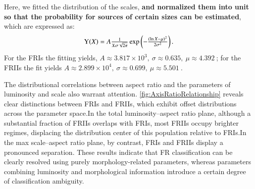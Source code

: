\documentclass{aa}
\begin{document}
Here, we fitted the distribution of the scales, \textbf{and normalized them into unit so that the probability for sources of certain sizes can be estimated}, which are expressed as:
\begin{equation} 
\makebox[\linewidth]{$\mathrm{Y}(X) = A\frac{1}{X \sigma \sqrt{2\pi}} \exp\left(-\frac{(\ln X- \mu )^2}{2\sigma^2}\right).$}
\end{equation}
For the FRIs the fitting yields,
$A \approx 3.817 \times 10^3,\  \sigma \approx 0.635,\ \mu \approx 4.392 \ $;
for the FRIIs the fit yields 
$ A \approx 2.899 \times 10^4,\  \sigma \approx 0.699,\ \mu \approx 5.501 \ $.

The distributional correlations between aspect ratio and the parameters of luminosity and scale also warrant attention.
\autoref{fig:AxisRatioRelationship} reveals clear distinctions between FRIs and FRIIs, which exhibit offset distributions across the parameter space.In the total luminosity–aspect ratio plane, although a substantial fraction of FRIIs overlaps with FRIs, most FRIIs occupy brighter regimes, displacing the distribution center of this population relative to FRIs.In the max scale–aspect ratio plane, by contrast, FRIs and FRIIs display a pronounced separation.
These results indicate that FR classification can be clearly resolved using purely morphology-related parameters, whereas parameters combining luminosity and morphological information introduce a certain degree of classification ambiguity.
\end{document}
